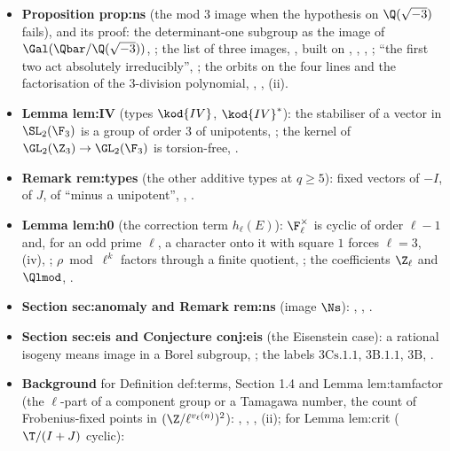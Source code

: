 \begin{itemize}
\item \textbf{Proposition prop:ns} (the mod $3$ image when the hypothesis on $\Q(\sqrt{-3})$ fails), and its proof:
the determinant-one subgroup as the image of $\Gal(\Qbar/\Q(\sqrt{-3}))$, ; the list of three images,
, built on , , , ;
``the first two act absolutely irreducibly'', ; the orbits on the four lines and the factorisation of
the $3$-division polynomial, , , (ii).
\item \textbf{Lemma lem:IV} (types $\kod{IV}$, $\kod{IV}^*$): the stabiliser of a vector in $\SL_2(\F_3)$ is a group of order $3$ of unipotents,
; the kernel of $\GL_2(\Z_3)\to\GL_2(\F_3)$ is torsion-free, .
\item \textbf{Remark rem:types} (the other additive types at $q\ge5$): fixed vectors of $-I$, of $J$, of ``minus a unipotent'',
, .
\item \textbf{Lemma lem:h0} (the correction term $h_\ell(E)$): $\F_\ell^\times$ is cyclic of order $\ell-1$ and, for an odd prime $\ell$, a character onto it with square $1$
forces $\ell=3$, (iv), ; $\rho\bmod\ell^k$ factors through a finite quotient,
; the coefficients $\Z_\ell$ and $\Qlmod$, .
\item \textbf{Section sec:anomaly and Remark rem:ns} (image $\Ns$): , , .
\item \textbf{Section sec:eis and Conjecture conj:eis} (the Eisenstein case): a rational isogeny means image in a Borel subgroup,
; the labels $3\mathrm{Cs}.1.1$, $3\mathrm B.1.1$, $3\mathrm B$, .
\item \textbf{Background} for Definition def:terms, Section 1.4 and Lemma lem:tamfactor (the $\ell$-part of a component group or a
Tamagawa number, the count of Frobenius-fixed points in $(\Z/\ell^{v_\ell(n)})^2$): ,
, , (ii); for Lemma lem:crit ($\T/(I+J)$ cyclic):

\end{itemize}
